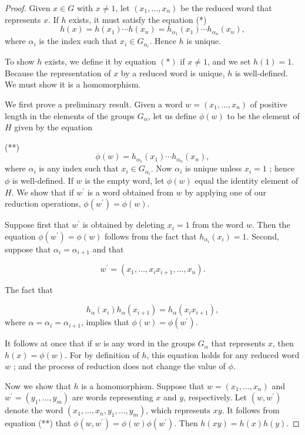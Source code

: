 \begin{proof}
Given \(x \in G\) with \(x \neq 1\), let \(( {x_{1},\ldots ,x_{n}})\) be the reduced word that represents \(x\). If \(h\) exists, it must satisfy the equation
(*)
\[
h(x) = h( x_{1}) \cdots h( x_{n}) = h_{{\alpha }_{1}}( x_{1}) \cdots {h}_{{\alpha }_{n}}( x_{n}),
\]
where \({\alpha }_{i}\) is the index such that \(x_{i} \in {G}_{{\alpha }_{i}}\). Hence \(h\) is unique.

To show \(h\) exists, we define it by equation \(( *)\) if \(x \neq 1\), and we set \(h(1) = 1\). Because the representation of \(x\) by a reduced word is unique, \(h\) is well-defined. We must show it is a homomorphism.

We first prove a preliminary result. Given a word \(w = ( {x_{1},\ldots ,x_{n}})\) of positive length in the elements of the groups \(G_{\alpha }\), let us define \(\phi ( w)\) to be the element of \(H\) given by the equation

(**)
\[
\phi ( w) = h_{{\alpha }_{1}}( x_{1}) \cdots {h}_{{\alpha }_{n}}( x_{n}),
\]
where \({\alpha }_{i}\) is any index such that \(x_{i} \in {G}_{{\alpha }_{i}}\). Now \({\alpha }_{i}\) is unique unless \(x_{i} = 1\) ; hence \(\phi\) is well-defined. If \(w\) is the empty word, let \(\phi ( w)\) equal the identity element of \(H\). We show that if \(w^{\prime }\) is a word obtained from \(w\) by applying one of our reduction operations, \(\phi ( w^{\prime }) = \phi ( w)\).

Suppose first that \(w^{\prime }\) is obtained by deleting \(x_{i} = 1\) from the word \(w\). Then the equation \(\phi ( w^{\prime }) = \phi ( w)\) follows from the fact that \(h_{{\alpha }_{i}}( x_{i}) = 1\). Second, suppose that \({\alpha }_{i} = {\alpha }_{i + 1}\) and that

\[
w^{\prime } = ( {x_{1},\ldots ,x_{i}x_{i + 1},\ldots ,x_{n}}).
\]

The fact that

\[
h_{\alpha }( x_{i}) h_{\alpha }( x_{i + 1}) = h_{\alpha }( {x_{i}x_{i + 1}}),
\]
where \(\alpha = {\alpha }_{i} = {\alpha }_{i + 1}\), implies that \(\phi ( w) = \phi ( w^{\prime })\).

It follows at once that if \(w\) is any word in the groups \(G_{\alpha }\) that represents \(x\), then \(h(x) = \phi ( w)\). For by definition of \(h\), this equation holds for any reduced word \(w\) ; and the process of reduction does not change the value of \(\phi\).

Now we show that \(h\) is a homomorphism. Suppose that \(w = ( {x_{1},\ldots ,x_{n}})\) and \(w^{\prime } = ( {y_{1},\ldots ,y_{m}})\) are words representing \(x\) and \(y\), respectively. Let \(( {w,w^{\prime }})\) denote the word \(( {x_{1},\ldots ,x_{n},y_{1},\ldots ,y_{m}})\), which represents \({xy}\). It follows from equation (**) that \(\phi ( {w,w^{\prime }}) = \phi ( w) \phi ( w^{\prime })\). Then \(h( {xy}) = h(x) h( y)\).


\end{proof}
